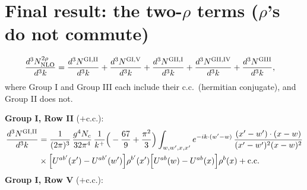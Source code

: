 \documentclass[9pt]{article}
\numberwithin{equation}{section}
\begin{document}
\section{Final result: the two-$\rho$ terms ($\rho$'s do not commute)}
\begin{align}
\frac{d^{3}N^{2\rho}_{\rm NLO}}{d^{3}k}&=\frac{d^{3}N^{\rm GI,II}}{d^{3}k}+\frac{d^{3}N^{\rm GI,V}}{d^{3}k}+\frac{d^{3}N^{\rm GII,I}}{d^{3}k}+\frac{d^{3}N^{\rm GII,IV}}{d^{3}k}+\frac{d^{3}N^{\rm GIII}}{d^{3}k},
\end{align}
where Group I and Group III each include their c.c.\ (hermitian conjugate), and Group II does not.

\noindent\textbf{Group I, Row II} ($+$c.c.):
\begin{align}
\frac{d^{3}N^{\rm GI,II}}{d^{3}k}&=\frac{1}{(2\pi)^{3}}\,\frac{g^{4}N_{c}}{32\pi^{4}}\,\frac{1}{k^{+}}\Big(-\frac{67}{9}+\frac{\pi^{2}}{3}\Big)\int_{w,w',x,x'}e^{-ik\cdot(w'-w)}\,\frac{(x'-w')\cdot(x-w)}{(x'-w')^{2}(x-w)^{2}}\notag\\
&\times\Big[U^{ab'}(x')-U^{ab'}(w')\Big]\rho^{b'}(x')\Big[U^{ab}(w)-U^{ab}(x)\Big]\rho^{b}(x)+{\rm c.c.}
\end{align}
\textbf{Group I, Row V} ($+$c.c.):
\end{document}
